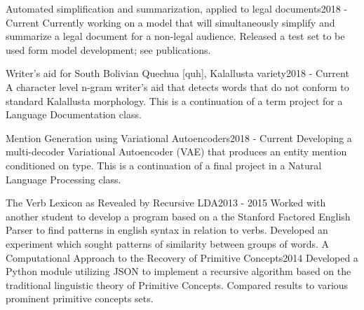 %
%
%


\begin{projects}
	\projectsimple
	{Automated simplification and summarization, applied to legal documents}{2018 - Current}
	{Currently working on a model that will simultaneously simplify and summarize a legal document for a non-legal audience. Released a test set to be used form model development; see publications. }

	\projectsimplelink
	{Writer's aid for South Bolivian Quechua [quh], Kalallusta variety}{2018 - Current}
	{ }
	{A character level n-gram writer's aid that detects words that do not conform to standard Kalallusta morphology. This is a continuation of a term project for a Language Documentation class. }

	\projectsimple
	{Mention Generation using Variational Autoencoders}{2018 - Current}
	{Developing a multi-decoder Variational Autoencoder (VAE) that produces an entity mention conditioned on type. This is a continuation of a final project in a Natural Language Processing class.  }

	\projectsimplelink
	{The Verb Lexicon as Revealed by Recursive LDA}{2013 - 2015}
	{ }
	{Worked with another student to develop a program based on a the Stanford Factored English Parser to find patterns in english syntax in relation to verbs. Developed an experiment which sought patterns of similarity between groups of words.}
	\projectsimplelink
	{A Computational Approach to the Recovery of Primitive Concepts}{2014}
	{ }
	{Developed a Python module utilizing JSON to implement a recursive algorithm based on the traditional linguistic theory of Primitive Concepts. Compared results to various prominent primitive concepts sets.}

\end{projects}
